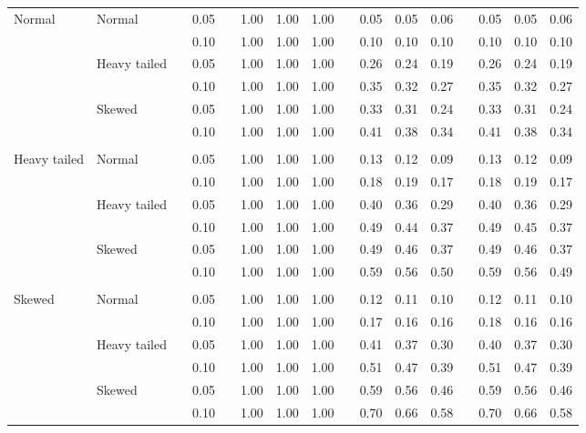 \begin{table}[ht]
\begin{scriptsize}
\begin{tabular}{ll p{.1cm} c p{.1cm} rrr p{.1cm} rrr p{.1cm} rrr}
\rowcolor{gray!20} Normal       & Normal       && 0.05 &&   1.00 & 1.00 & 1.00 && 0.05 & 0.05 & 0.06 && 0.05 & 0.05 & 0.06 \\ 
\rowcolor{gray!20}             &              && 0.10 &&   1.00 & 1.00 & 1.00 && 0.10 & 0.10 & 0.10 && 0.10 & 0.10 & 0.10 \\ 
\rowcolor{gray!20}             & Heavy tailed && 0.05 &&   1.00 & 1.00 & 1.00 && 0.26 & 0.24 & 0.19 && 0.26 & 0.24 & 0.19 \\ 
\rowcolor{gray!20}             &              && 0.10 &&   1.00 & 1.00 & 1.00 && 0.35 & 0.32 & 0.27 && 0.35 & 0.32 & 0.27 \\ 
\rowcolor{gray!20}             & Skewed       && 0.05 &&   1.00 & 1.00 & 1.00 && 0.33 & 0.31 & 0.24 && 0.33 & 0.31 & 0.24 \\ 
\rowcolor{gray!20}             &              && 0.10 &&   1.00 & 1.00 & 1.00 && 0.41 & 0.38 & 0.34 && 0.41 & 0.38 & 0.34 \\ 
             &&&&&&&&&&&&&&&\\
Heavy tailed & Normal       && 0.05 &&   1.00 & 1.00 & 1.00 && 0.13 & 0.12 & 0.09 && 0.13 & 0.12 & 0.09 \\ 
             &              && 0.10 &&   1.00 & 1.00 & 1.00 && 0.18 & 0.19 & 0.17 && 0.18 & 0.19 & 0.17 \\ 
             & Heavy tailed && 0.05 &&   1.00 & 1.00 & 1.00 && 0.40 & 0.36 & 0.29 && 0.40 & 0.36 & 0.29 \\ 
             &              && 0.10 &&   1.00 & 1.00 & 1.00 && 0.49 & 0.44 & 0.37 && 0.49 & 0.45 & 0.37 \\ 
             & Skewed       && 0.05 &&   1.00 & 1.00 & 1.00 && 0.49 & 0.46 & 0.37 && 0.49 & 0.46 & 0.37 \\ 
             &              && 0.10 &&   1.00 & 1.00 & 1.00 && 0.59 & 0.56 & 0.50 && 0.59 & 0.56 & 0.49 \\
             &&&&&&&&&&&&&&&\\ 
Skewed       & Normal       && 0.05 &&   1.00 & 1.00 & 1.00 && 0.12 & 0.11 & 0.10 && 0.12 & 0.11 & 0.10 \\ 
             &              && 0.10 &&   1.00 & 1.00 & 1.00 && 0.17 & 0.16 & 0.16 && 0.18 & 0.16 & 0.16 \\ 
             & Heavy tailed && 0.05 &&   1.00 & 1.00 & 1.00 && 0.41 & 0.37 & 0.30 && 0.40 & 0.37 & 0.30 \\ 
             &              && 0.10 &&   1.00 & 1.00 & 1.00 && 0.51 & 0.47 & 0.39 && 0.51 & 0.47 & 0.39 \\ 
             & Skewed       && 0.05 &&   1.00 & 1.00 & 1.00 && 0.59 & 0.56 & 0.46 && 0.59 & 0.56 & 0.46 \\ 
             &              && 0.10 &&   1.00 & 1.00 & 1.00 && 0.70 & 0.66 & 0.58 && 0.70 & 0.66 & 0.58 \\ 


\end{tabular}
\end{scriptsize}
\end{table}
